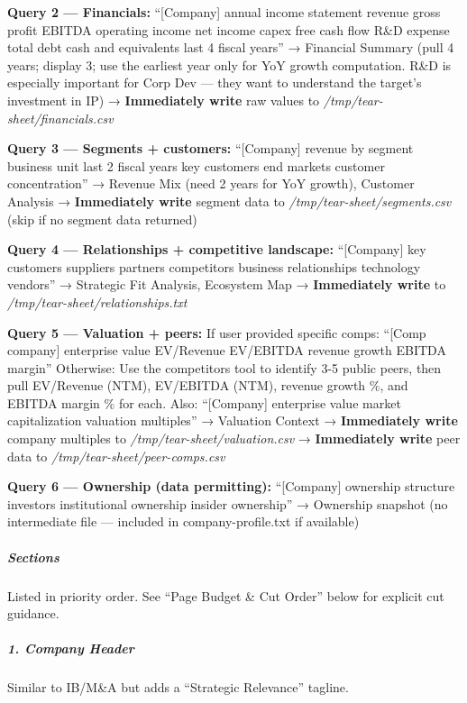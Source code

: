 \documentclass[11pt]{article}
\begin{document}
\textbf{Query 2 — Financials:} ``[Company] annual income statement revenue gross profit EBITDA operating income net income capex free cash flow R\&D expense total debt cash and equivalents last 4 fiscal years'' → Financial Summary (pull 4 years; display 3; use the earliest year only for YoY growth computation. R\&D is especially important for Corp Dev — they want to understand the target's investment in IP) → \textbf{Immediately write} raw values to \emph{/tmp/tear-sheet/financials.csv}


\textbf{Query 3 — Segments + customers:} ``[Company] revenue by segment business unit last 2 fiscal years key customers end markets customer concentration'' → Revenue Mix (need 2 years for YoY growth), Customer Analysis → \textbf{Immediately write} segment data to \emph{/tmp/tear-sheet/segments.csv} (skip if no segment data returned)


\textbf{Query 4 — Relationships + competitive landscape:} ``[Company] key customers suppliers partners competitors business relationships technology vendors'' → Strategic Fit Analysis, Ecosystem Map → \textbf{Immediately write} to \emph{/tmp/tear-sheet/relationships.txt}


\textbf{Query 5 — Valuation + peers:} If user provided specific comps: ``[Comp company] enterprise value EV/Revenue EV/EBITDA revenue growth EBITDA margin'' Otherwise: Use the competitors tool to identify 3-5 public peers, then pull EV/Revenue (NTM), EV/EBITDA (NTM), revenue growth \%, and EBITDA margin \% for each. Also: ``[Company] enterprise value market capitalization valuation multiples'' → Valuation Context → \textbf{Immediately write} company multiples to \emph{/tmp/tear-sheet/valuation.csv} → \textbf{Immediately write} peer data to \emph{/tmp/tear-sheet/peer-comps.csv}


\textbf{Query 6 — Ownership (data permitting):} ``[Company] ownership structure investors institutional ownership insider ownership'' → Ownership snapshot (no intermediate file — included in company-profile.txt if available)


\subparagraph{Sections}\mbox{}\par

Listed in priority order. See ``Page Budget \& Cut Order'' below for explicit cut guidance.


\subparagraph{1. Company Header}\mbox{}\par
Similar to IB/M\&A but adds a ``Strategic Relevance'' tagline.
\end{document}
